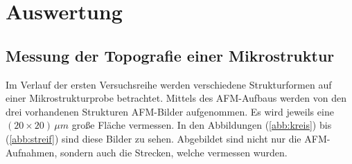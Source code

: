 \section{Auswertung}
\label{sec:Auswertung}
\subsection{Messung der Topografie einer Mikrostruktur}
Im Verlauf der ersten Versuchsreihe werden verschiedene Strukturformen auf einer Mikrostrukturprobe betrachtet.
Mittels des AFM-Aufbaus werden von den drei vorhandenen Strukturen AFM-Bilder aufgenommen.
Es wird jeweils eine $(20 \times 20) \, \mu m$ gro{\ss}e Fl\"ache vermessen.
In den Abbildungen (\ref{abb:kreis}) bis (\ref{abb:streif}) sind diese Bilder zu sehen.
Abgebildet sind nicht nur die AFM-Aufnahmen, sondern auch die Strecken, welche vermessen wurden.
